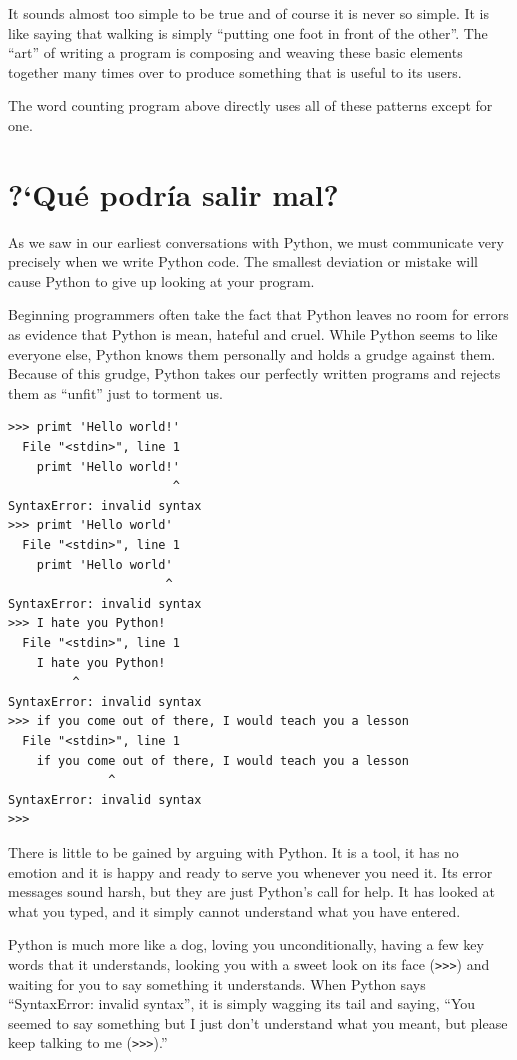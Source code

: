 It sounds almost too simple to be true and of course it is never
so simple.  It is like saying that walking is simply
``putting one foot in front of the other''.  The ``art'' 
of writing a program is composing and weaving these
basic elements together many times over to produce something
that is useful to its users.

The word counting program above directly uses all of 
these patterns except for one.

\section{?`Qu\'e podr\'ia salir mal?}

As we saw in our earliest conversations with Python, we must
communicate very precisely when we write Python code.  The smallest
deviation or mistake will cause Python to give up looking at your
program.

Beginning programmers often take the fact that Python leaves no
room for errors as evidence that Python is mean, hateful and cruel.
While Python seems to like everyone else, Python knows them 
personally and holds a grudge against them.  Because of this grudge,
Python takes our perfectly written programs and rejects them as 
``unfit'' just to torment us.

\beforeverb
\begin{verbatim}
>>> primt 'Hello world!'
  File "<stdin>", line 1
    primt 'Hello world!'
                       ^
SyntaxError: invalid syntax
>>> primt 'Hello world'
  File "<stdin>", line 1
    primt 'Hello world'
                      ^
SyntaxError: invalid syntax
>>> I hate you Python!
  File "<stdin>", line 1
    I hate you Python!
         ^
SyntaxError: invalid syntax
>>> if you come out of there, I would teach you a lesson
  File "<stdin>", line 1
    if you come out of there, I would teach you a lesson
              ^
SyntaxError: invalid syntax
>>> 
\end{verbatim}
\afterverb
%
There is little to be gained by arguing with Python.  It is a tool,
it has no emotion and it is happy and ready to serve you whenever you
need it.  Its error messages sound harsh, but they are just Python's
call for help.  It has looked at what you typed, and it simply cannot
understand what you have entered.

Python is much more like a dog, loving you unconditionally, having a few
key words that it understands, looking you with a sweet look on its
face ({\tt >>>}) and waiting for you to say something it understands.
When Python says ``SyntaxError: invalid syntax'', it is simply wagging
its tail and saying, ``You seemed to say something but I just don't
understand what you meant, but please keep talking to me ({\tt >>>}).''

